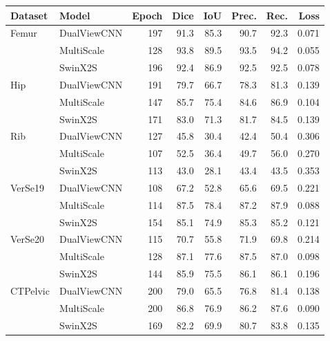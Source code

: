 \begin{tabular}{llrrrrrr}
\toprule
Dataset & Model & Epoch & Dice & IoU & Prec. & Rec. & Loss \\
\midrule
Femur & DualViewCNN & 197 & 91.3 & 85.3 & 90.7 & 92.3 & 0.071 \\
 & MultiScale & 128 & 93.8 & 89.5 & 93.5 & 94.2 & 0.055 \\
 & SwinX2S & 196 & 92.4 & 86.9 & 92.5 & 92.5 & 0.078 \\
Hip & DualViewCNN & 191 & 79.7 & 66.7 & 78.3 & 81.3 & 0.139 \\
 & MultiScale & 147 & 85.7 & 75.4 & 84.6 & 86.9 & 0.104 \\
 & SwinX2S & 171 & 83.0 & 71.3 & 81.7 & 84.5 & 0.139 \\
Rib & DualViewCNN & 127 & 45.8 & 30.4 & 42.4 & 50.4 & 0.306 \\
 & MultiScale & 107 & 52.5 & 36.4 & 49.7 & 56.0 & 0.270 \\
 & SwinX2S & 113 & 43.0 & 28.1 & 43.4 & 43.5 & 0.353 \\
VerSe19 & DualViewCNN & 108 & 67.2 & 52.8 & 65.6 & 69.5 & 0.221 \\
 & MultiScale & 114 & 87.5 & 78.4 & 87.2 & 87.9 & 0.088 \\
 & SwinX2S & 154 & 85.1 & 74.9 & 85.3 & 85.2 & 0.121 \\
VerSe20 & DualViewCNN & 115 & 70.7 & 55.8 & 71.9 & 69.8 & 0.214 \\
 & MultiScale & 128 & 87.1 & 77.6 & 87.5 & 87.0 & 0.098 \\
 & SwinX2S & 144 & 85.9 & 75.5 & 86.1 & 86.1 & 0.196 \\
CTPelvic & DualViewCNN & 200 & 79.0 & 65.5 & 76.8 & 81.4 & 0.138 \\
 & MultiScale & 200 & 86.8 & 76.9 & 86.2 & 87.6 & 0.090 \\
 & SwinX2S & 169 & 82.2 & 69.9 & 80.7 & 83.8 & 0.135 \\
\bottomrule
\end{tabular}
